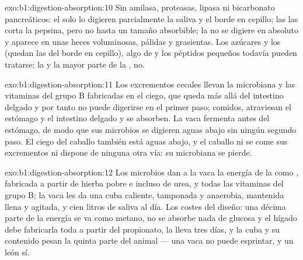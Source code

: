 \begin{solution}{exo:b1:digestion-absorption:10}
Sin amilasa, proteasas, lipasa ni bicarbonato pancreáticos: el  solo
lo digieren parcialmente la saliva y el borde en cepillo; las  las
corta la pepsina, pero no hasta un tamaño absorbible; la  no se digiere
en absoluto y aparece en unas heces voluminosas, pálidas y grasientas. Los
azúcares y los  (quedan las  del borde en cepillo), algo
de  y los péptidos pequeños todavía pueden tratarse; la  y la
mayor parte de la , no.
\end{solution}

\begin{solution}{exo:b1:digestion-absorption:11}
Los excrementos cecales llevan la  microbiana y las vitaminas del
grupo B fabricadas en el ciego, que queda más allá del intestino delgado y
por tanto no puede digerirse en el primer paso; comidos, atraviesan el
estómago y el intestino delgado y se absorben. La vaca fermenta antes del
estómago, de modo que sus microbios se digieren aguas abajo sin ningún
segundo paso. El ciego del caballo también está aguas abajo, y el caballo ni
se come sus excrementos ni dispone de ninguna otra vía: su 
microbiana se pierde.
\end{solution}

\begin{solution}{exo:b1:digestion-absorption:12}
Los microbios dan a la vaca la energía de la  como ,
 fabricada a partir de hierba pobre e incluso de urea, y todas las
vitaminas del grupo B; la vaca les da una cuba caliente, tamponada y
anaerobia, mantenida llena y agitada, y cien litros de saliva al día. Los
costes del diseño: una décima parte de la energía se va como metano, no se
absorbe nada de glucosa y el hígado debe fabricarla toda a partir del
propionato, la  lleva tres días, y la cuba y su contenido pesan la
quinta parte del animal --- una vaca no puede esprintar, y un león sí.
\end{solution}

